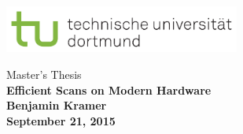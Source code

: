 \thispagestyle{empty}
\vspace*{-2.5cm}
\newlength{\links}
\setlength{\links}{0cm}
\sf

\hspace*{\links}
\begin{minipage}{12.5cm}
\includegraphics[width=7.75cm]{images/tud_logo_rgb}
\end{minipage}

\vspace*{3.75cm}

\hspace*{\links}
\hspace*{0.5cm}
\begin{minipage}{9cm}
\large
\begin{center}
{\LARGE Master's Thesis}\\
\vspace*{1cm}
\bf{\LARGE Efficient Scans on Modern Hardware}\\
\vspace*{1.5cm}
\large Benjamin Kramer\\
September 21, 2015
\end{center}
\end{minipage}

\vspace*{4cm}

\hspace*{\links}


\vspace*{.6cm}

